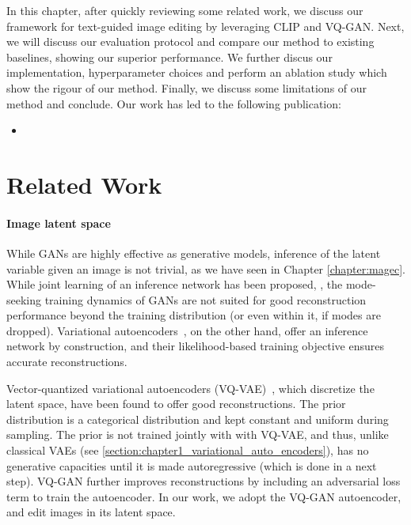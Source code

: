 In this chapter, after quickly reviewing some related work, we discuss our framework for 
text-guided image editing by leveraging \ac{CLIP} 
and VQ-GAN. Next, we will discuss our evaluation protocol and compare our method to existing baselines, 
showing our superior performance. We further discus our implementation, hyperparameter choices and perform an 
ablation study which show the rigour of our method. Finally, we discuss some limitations of our method and 
conclude. Our work has led to the following publication:

\begin{itemize}
    \item {}
\end{itemize}



\section{Related Work}


\paragraph{Image latent space}
While GANs are highly effective as generative models, inference of the latent variable 
given an image is not trivial, as we have seen in Chapter \ref{chapter:magec}. 
While joint learning of an inference network has been proposed, \citep{donahue17iclr,dumoulin17iclr}, 
the mode-seeking training dynamics of GANs are 
 not suited for good reconstruction performance beyond the training distribution 
 (or even within it, if modes are dropped).
Variational autoencoders~\cite{Kingma2014}, on the other hand, offer an inference 
network by construction, and their likelihood-based training objective ensures accurate 
reconstructions.

Vector-quantized  variational autoencoders (VQ-VAE)~\cite{oord17nips,razavi2019generating},
 which discretize the latent space, have been found to offer good reconstructions. The prior distribution
 is a categorical distribution and kept constant and uniform during sampling.
 The prior is not trained jointly with with VQ-VAE, and thus, unlike classical \ac{VAE}s (see \ref{section:chapter1_variational_auto_encoders}),
 has no generative capacities until it is made autoregressive (which is done in a next step). 
VQ-GAN \citep{esser2021taming,yu2021vector} further improves reconstructions 
by  including an adversarial loss term to train the autoencoder.
In our work,  we adopt the VQ-GAN autoencoder,  and edit  images in its latent space.



